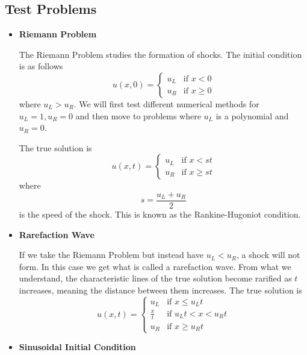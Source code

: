 \documentclass{myproject}
\begin{document}
\subsection{Test Problems}
\begin{itemize}
	\item \textbf{Riemann Problem}
	
    The Riemann Problem studies the formation of shocks. The initial condition is as follows
	\begin{equation}
		u(x,0) = 
	    \begin{cases}
	      	u_L & \text{if } x < 0 \\
			u_R & \text{if } x \geq 0
	    \end{cases}
	\end{equation}
	where $u_L > u_R$. We will first test different numerical methods for $u_L = 1, u_R = 0$ and then move to problems where $u_L$ is a polynomial and $u_R = 0$.
	
    The true solution is
	\begin{equation}
		u(x,t) = 
	    \begin{cases}
	      	u_L & \text{if } x < st \\
			u_R & \text{if } x \geq st
	    \end{cases}
	\end{equation}
	where \[s = \frac{u_L + u_R}{2}\] is the speed of the shock. This is known as the Rankine-Hugoniot condition.
	
	\item \textbf{Rarefaction Wave}
	
    If we take the Riemann Problem but instead have $u_L < u_R$, a shock will not form. In this case we get what is called a rarefaction wave. From what we understand, the characteristic lines of the true solution become rarified as $t$ increases, meaning the distance between them increases.
	The true solution is
	\begin{equation}
		u(x,t) = 
	    \begin{cases}
	      	u_L & \text{if } x \leq {u_L}t \\
			\frac{x}{t} & \text{if } {u_L}t < x < {u_R}t \\
			u_R & \text{if } x \geq {u_R}t
	    \end{cases}
	\end{equation}

	\item \textbf{Sinusoidal Initial Condition}


\end{itemize}
\end{document}
